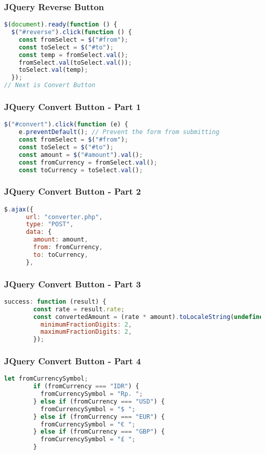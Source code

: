 \documentclass[aspectratio=169, table]{beamer}
\begin{document}
\begin{frame}[fragile]
    \frametitle{JQuery Reverse Button}
    \begin{lstlisting}[language=JavaScript]
$(document).ready(function () {
  $("#reverse").click(function () {
    const fromSelect = $("#from");
    const toSelect = $("#to");
    const temp = fromSelect.val();
    fromSelect.val(toSelect.val());
    toSelect.val(temp);
  });
// Next is Convert Button
    \end{lstlisting}
\end{frame}

\begin{frame}[fragile]
    \frametitle{JQuery Convert Button - Part 1}
    \begin{lstlisting}[language=JavaScript]
$("#convert").click(function (e) {
    e.preventDefault(); // Prevent the form from submitting
    const fromSelect = $("#from");
    const toSelect = $("#to");
    const amount = $("#amount").val();
    const fromCurrency = fromSelect.val();
    const toCurrency = toSelect.val();
    \end{lstlisting}
\end{frame}

\begin{frame}[fragile]
    \frametitle{JQuery Convert Button - Part 2}
    \begin{lstlisting}[language=JavaScript]
$.ajax({
      url: "converter.php",
      type: "POST",
      data: {
        amount: amount,
        from: fromCurrency,
        to: toCurrency,
      },
    \end{lstlisting}
\end{frame}

\begin{frame}[fragile]
    \frametitle{JQuery Convert Button - Part 3}
    \begin{lstlisting}[language=JavaScript]
success: function (result) {
        const rate = result.rate;
        const convertedAmount = (rate * amount).toLocaleString(undefined, {
          minimumFractionDigits: 2,
          maximumFractionDigits: 2,
        });
    \end{lstlisting}
\end{frame}

\begin{frame}[fragile]
    \frametitle{JQuery Convert Button - Part 4}
    \begin{lstlisting}[language=JavaScript]
let fromCurrencySymbol;
        if (fromCurrency === "IDR") {
          fromCurrencySymbol = "Rp. ";
        } else if (fromCurrency === "USD") {
          fromCurrencySymbol = "$ ";
        } else if (fromCurrency === "EUR") {
          fromCurrencySymbol = "€ ";
        } else if (fromCurrency === "GBP") {
          fromCurrencySymbol = "£ ";
        }
    \end{lstlisting}
\end{frame}
\end{document}
